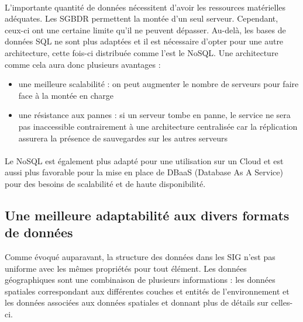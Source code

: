\paragraph{}L’importante quantité de données nécessitent d’avoir les ressources matérielles adéquates. Les SGBDR permettent la montée d’un seul serveur. Cependant, ceux-ci ont une certaine limite qu’il ne peuvent dépasser. Au-delà, les bases de données SQL ne sont plus adaptées et il est nécessaire d’opter pour une autre architecture, cette fois-ci distribuée comme l’est le NoSQL. Une architecture comme cela aura donc plusieurs avantages :
\begin{itemize}[label=\textbullet]
    \item une meilleure scalabilité : on peut augmenter le nombre de serveurs pour faire face à la montée en charge
    \item une résistance aux pannes : si un serveur tombe en panne, le service ne sera pas inaccessible contrairement à une architecture centralisée car la réplication assurera la présence de sauvegardes sur les autres serveurs
\end{itemize}


\paragraph{}Le NoSQL est également plus adapté pour une utilisation sur un Cloud et est aussi plus favorable pour la mise en place de DBaaS (Database As A Service) pour des besoins de scalabilité et de haute disponibilité.

\subsection{Une meilleure adaptabilité aux divers formats de données}
Comme évoqué auparavant, la structure des données dans les SIG n’est pas uniforme avec les mêmes propriétés pour tout élément. Les données géographiques sont une combinaison de plusieurs informations : les données spatiales correspondant aux différentes couches et entités de l’environnement et les données associées aux données spatiales et donnant plus de détails sur celles-ci.
